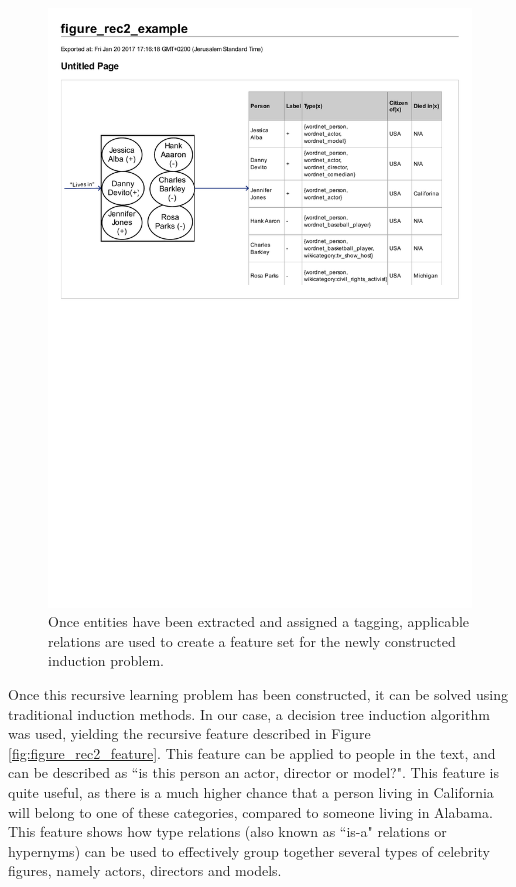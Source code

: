 \documentclass[twoside,11pt]{article}
\theoremstyle{definition}
\begin{document}
\begin{figure}[!h]
	\centering
	\includegraphics[width=\linewidth]{figure_rec2_example}
	\caption{Once entities have been extracted and assigned a tagging, applicable relations are used to create a feature set for the newly constructed induction problem.}
	\label{fig:figure_rec2_example}
\end{figure}

Once this recursive learning problem has been constructed, it can be solved using traditional induction methods. In our case, a decision tree induction algorithm was used, yielding the recursive feature described in Figure \ref{fig:figure_rec2_feature}. This feature can be applied to people in the text, and can be described as ``is this person an actor, director or model?". This feature is quite useful, as there is a much higher chance that a person living in California will belong to one of these categories, compared to someone living in Alabama. This feature shows how type relations (also known as ``is-a" relations or hypernyms) can be used to effectively group together several types of celebrity figures, namely actors, directors and models.
\end{document}
